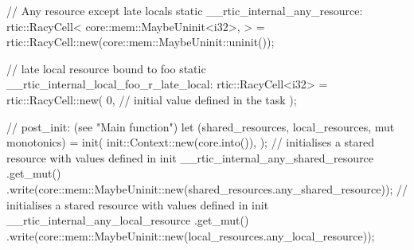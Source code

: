 // Any resource except late locals
static __rtic_internal_any_resource: rtic::RacyCell<
    core::mem::MaybeUninit<i32>,
> = rtic::RacyCell::new(core::mem::MaybeUninit::uninit());

// late local resource bound to foo
static __rtic_internal_local_foo_r_late_local: rtic::RacyCell<i32> = rtic::RacyCell::new(
    0, // initial value defined in the task
);

// post_init: (see "Main function")
let (shared_resources, local_resources, mut monotonics) = init(
    init::Context::new(core.into()),
);
// initialises a stared resource with values defined in init
__rtic_internal_any_shared_resource
    .get_mut()
    .write(core::mem::MaybeUninit::new(shared_resources.any_shared_resource));
// initialises a stared resource with values defined in init
    __rtic_internal_any_local_resource
    .get_mut()
    .write(core::mem::MaybeUninit::new(local_resources.any_local_resource));